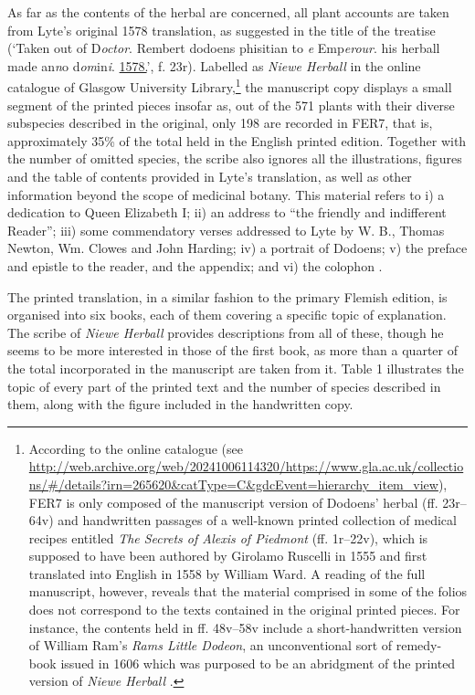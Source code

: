 \documentclass{article}
\begin{document}
As far as the contents of the herbal are concerned, all plant accounts
are taken from Lyte's original 1578 translation, as suggested in the
title of the treatise (`Taken out of D\emph{octor}. Rembert dodoens
phisitian to \th\emph{e} Emp\emph{erour}. his herball made an\emph{n}o
d\emph{om}in\emph{i}. \uline{1578.}', f. 23r). Labelled as \emph{Niewe
Herball} in the online catalogue of Glasgow University
Library,\footnote{According to the online catalogue
  (see \url{http://web.archive.org/web/20241006114320/https://www.gla.ac.uk/collections/\#/details?irn=265620&catType=C&gdcEvent=hierarchy_item_view}), FER7 is
  only composed of the manuscript version of Dodoens' herbal (ff.
  23r--64v) and handwritten passages of a well-known printed collection
  of medical recipes entitled \emph{The Secrets of Alexis of Piedmont}
  (ff. 1r--22v), which is supposed to have been authored by Girolamo
  Ruscelli in 1555 \citep[see][]{bela_authorship_2016} and first translated into English in
  1558 by William Ward. A reading of the full manuscript, however,
  reveals that the material comprised in some of the folios does not
  correspond to the texts contained in the original printed pieces. For
  instance, the contents held in ff. 48v--58v include a short-handwritten
  version of William Ram's \emph{Rams Little Dodeon}, an unconventional
  sort of remedy-book issued in 1606 which was purposed to be an
  abridgment of the printed version of \emph{Niewe Herball} \citep[see][141]{barlow_old_1913}.} the manuscript copy displays a small segment of the
printed pieces insofar as, out of the 571 plants with their diverse
subspecies described in the original, only 198 are recorded in FER7,
that is, approximately 35\% of the total held in the English printed
edition. Together with the number of omitted species, the scribe also
ignores all the illustrations, figures and the table of contents
provided in Lyte's translation, as well as other information beyond the
scope of medicinal botany. This material refers to i) a dedication to
Queen Elizabeth I; ii) an address to ``the friendly and indifferent
Reader''; iii) some commendatory verses addressed to Lyte by W. B.,
Thomas Newton, Wm. Clowes and John Harding; iv) a portrait of Dodoens;
v) the preface and epistle to the reader, and the appendix; and vi) the
colophon \citealp[see][139]{barlow_old_1913}.

The printed translation, in a similar fashion to the primary Flemish
edition, is organised into six books, each of them covering a specific
topic of explanation. The scribe of \emph{Niewe Herball} provides
descriptions from all of these, though he seems to be more interested in
those of the first book, as more than a quarter of the total
incorporated in the manuscript are taken from it. Table 1 illustrates
the topic of every part of the printed text and the number of species
described in them, along with the figure included in the handwritten
copy.
\end{document}
